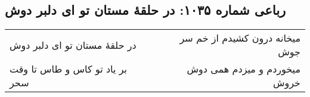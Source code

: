 \begin{center}
\section*{رباعی شماره ۱۰۳۵: در حلقهٔ مستان تو ای دلبر دوش}
\label{sec:1035}
\begin{longtable}{l p{0.5cm} r}
در حلقهٔ مستان تو ای دلبر دوش
&&
میخانه درون کشیدم از خم سر جوش
\\
بر یاد تو کاس و طاس تا وقت سحر
&&
میخوردم و میزدم همی دوش خروش
\\
\end{longtable}
\end{center}
